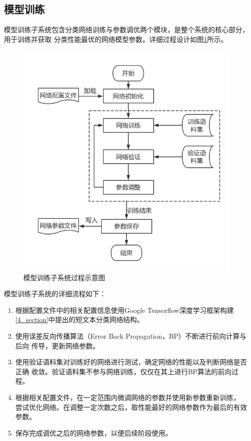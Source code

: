 \subsection{模型训练}
模型训练子系统包含分类网络训练与参数调优两个模块，是整个系统的核心部分，用于训练并获取
分类性能最优的网络模型参数。详细过程设计如图\ref{train}所示。
\begin{figure}[h]
    \includegraphics[scale=0.6]{picture/train.png}
    \caption{模型训练子系统过程示意图}
    \label{train}
\end{figure}
模型训练子系统的详细流程如下：
\begin{enumerate}
    \item 根据配置文件中的相关配置信息使用Google Tensorflow深度学习框架构建
    \ref{4_section}中提出的短文本分类网络结构。
    \item 使用误差反向传播算法（Error Back Propagation，BP）不断进行前向计算与后向
    传导，更新网络参数。
    \item 使用验证语料集对训练好的网络进行测试，确定网络的性能以及判断网络是否正确
    收敛。验证语料集不参与网络训练，仅仅在其上进行BP算法的前向过程。
    \item 根据相关配置文件，在一定范围内微调网络的参数并使用新参数重新训练，
    尝试优化网络。在调整一定次数之后，取性能最好的网络参数作为最后的有效参数。
    \item 保存完成调优之后的网络参数，以便后续阶段使用。
\end{enumerate}

